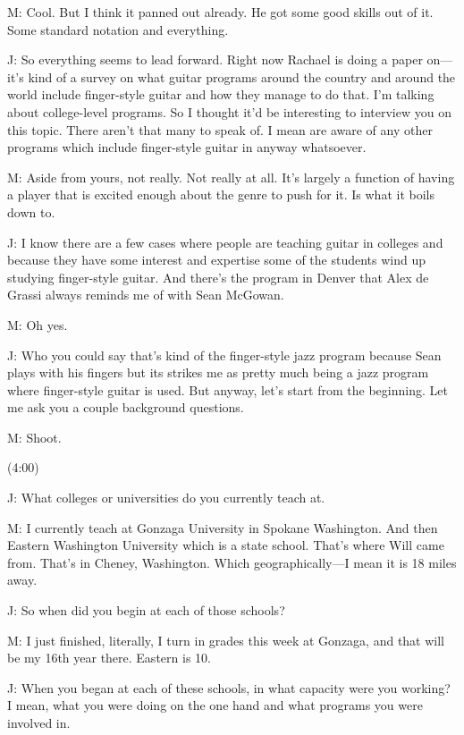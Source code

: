 \documentclass[11pt]{article}
\begin{document}
M: Cool. But I think it panned out already. He got some good skills out of it. Some standard notation and everything. 

J: So everything seems to lead forward. Right now Rachael is doing a paper on—it's kind of a survey on what guitar programs around the country and around the world include finger-style guitar and how they manage to do that. I'm talking about college-level programs. So I thought it'd be interesting to interview you on this topic. There aren't that many to speak of. I mean are aware of any other programs which include finger-style guitar in anyway whatsoever.

M: Aside from yours, not really. Not really at all. It's largely a function of having a player that is excited enough about the genre to push for it. Is what it boils down to. 

J: I know there are a few cases where people are teaching guitar in colleges and because they have some interest and expertise some of the students wind up studying finger-style guitar. And there's the program in Denver that Alex de Grassi always reminds me of with Sean McGowan. 

M: Oh yes.

J: Who you could say that's kind of the finger-style jazz program because Sean plays with his fingers but its strikes me as pretty much being a jazz program where finger-style guitar is used. But anyway, let's start from the beginning. Let me ask you a couple background questions.

M: Shoot.

(4:00)

J: What colleges or universities do you currently teach at. 

M: I currently teach at Gonzaga University in Spokane Washington. And then Eastern Washington University which is a state school. That's where Will came from. That's in Cheney, Washington. Which geographically—I mean it is 18 miles away.

J: So when did you begin at each of those schools?

M: I just finished, literally, I turn in grades this week at Gonzaga, and that will be my 16th year there. Eastern is 10. 

J: When you began at each of these schools, in what capacity were you working? I mean, what you were doing on the one hand and what programs you were involved in. 
\end{document}
